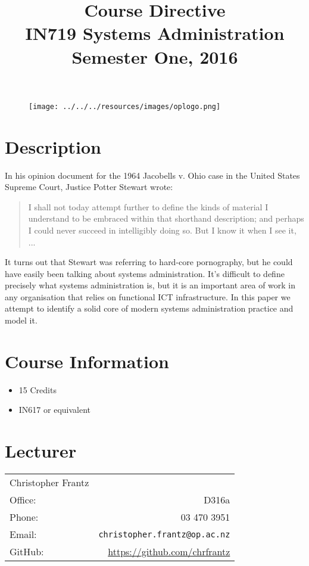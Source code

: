 \documentclass{article}
\begin{document}
\begin{figure}
\texttt{[image: ../../../resources/images/oplogo.png]}
\end{figure}

\title{Course Directive\\IN719 Systems Administration \\Semester One, 2016}
\date{}
\maketitle

\section*{Description}
In his opinion document for the 1964 Jacobells v. Ohio case in the United States Supreme Court, Justice Potter Stewart wrote:
\begin{quote}
I shall not today attempt further to define the kinds of material I understand to be embraced within that shorthand description; and perhaps I could never succeed in intelligibly doing so. But I know it when I see it, ...
\end{quote}
It turns out that Stewart was referring to hard-core pornography, but he could have easily been talking about systems administration. It's difficult to define precisely what systems administration is, but it is an important area of work in any organisation that relies on functional ICT infrastructure. In this paper we attempt to identify a solid core of modern systems administration practice and model it.



\section*{Course Information}
\begin{itemize}
  \item 15 Credits
  \item IN617 or equivalent
\end{itemize}

\section*{Lecturer}
\begin{tabular}{lr}

     Christopher Frantz &    \\
     Office: & D316a \\
     Phone: & 03 470 3951 \\
     Email: & \texttt{christopher.frantz@op.ac.nz} \\
     GitHub: & \url{https://github.com/chrfrantz} 
\end{tabular}
\end{document}

